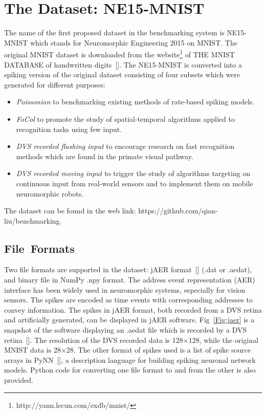 \section{The Dataset: NE15-MNIST}
\label{sec:data}
The name of the first proposed dataset in the benchmarking system is NE15-MNIST which stands for Neuromorphic Engineering 2015 on MNIST.
The original MNIST dataset is downloaded from the website\footnote{http://yann.lecun.com/exdb/mnist/} of THE MNIST DATABASE of handwritten digits~[\cite{lecun_gradient-based_1998}].
The NE15-MNIST is converted into a spiking version of the original dataset consisting of four subsets which were generated for different purposes:
\begin{itemize}
	\item \textit{Poissonian}
	to benchmarking existing methods of rate-based spiking models.
	\item \textit{FoCol}
	to promote the study of spatial-temporal algorithms applied to recognition tasks using few input.
	\item \textit{DVS recorded flashing input}
	to encourage research on fast recognition methods which are found in the primate visual pathway.
	\item \textit{DVS recorded moving input}
	to trigger the study of algorithms targeting on continuous input from real-world sensors and to implement them on mobile neuromorphic robots.
\end{itemize}
The dataset can be found in the web link: https://github.com/qian-liu/benchmarking.
\subsection{File~Formats}
	
Two file formats are supported in the dataset: jAER format~[\cite{delbruck2008frame}] (.dat or .aedat), and binary file in NumPy .npy format.
The  address event representation (AER) interface has been widely used in neuromorphic systems, especially for vision sensors.
The spikes are encoded as time events with corresponding addresses to convey information.
The spikes in jAER format, both recorded from a DVS retina and artificially generated, can be displayed in jAER software.
Fig~\ref{Fig:jaer} is a snapshot of the software displaying an .aedat file which is recorded by a DVS retina~[\cite{serrano-gotarredona_128_2013}].
The resolution of the DVS recorded data is 128$\times$128, while the original MNIST data is 28$\times$28.
The other format of spikes used is a list of spike source arrays in PyNN~[\cite{davison2008pynn}], a description language for building spiking neuronal network models.
Python code for converting one file format to and from the other is also provided.

